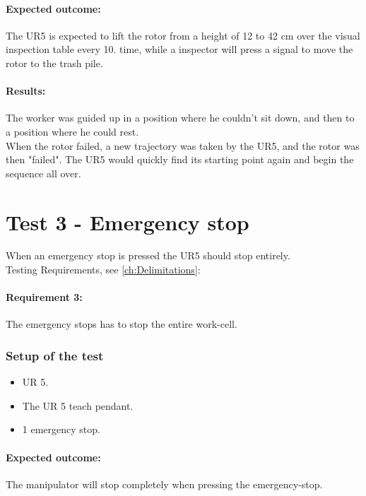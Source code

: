 \paragraph{Expected outcome:} 
The UR5 is expected to lift the rotor from a height of 12 to 42 cm over the visual inspection table every 10. time, while a inspector will press a signal to move the rotor to the trash pile. 

\paragraph{Results: }

The worker was guided up in a position where he couldn't sit down, and then to a position where he could rest.\\
When the rotor failed, a new trajectory was taken by the UR5, and the rotor was then "failed". The UR5 would quickly find its starting point again and begin the sequence all over.\\


\section{Test 3 - Emergency stop}

When an emergency stop is pressed the UR5 should stop entirely.\\
Testing Requirements, see  \ref{ch:Delimitations}:\\

\paragraph{Requirement 3:} The emergency stops has to stop the entire work-cell.\\

\subsubsection{Setup of the test}

\begin{itemize}
    \item UR 5.
    \item The UR 5 teach pendant.
    \item 1 emergency stop.
\end{itemize}

\paragraph{Expected outcome:}
The manipulator will stop completely when pressing the emergency-stop.

